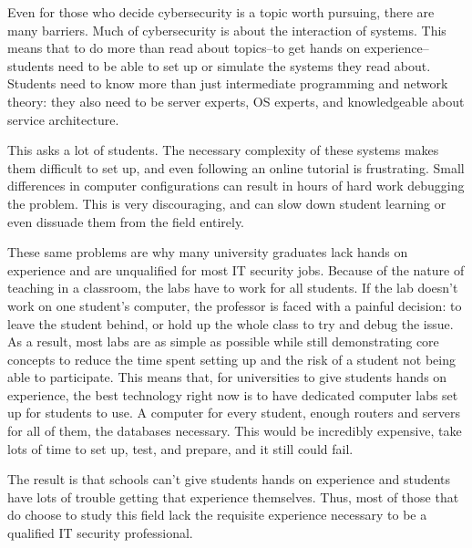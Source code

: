 \documentclass[openright]{report}
\begin{document}
\par Even for those who decide cybersecurity is a topic worth pursuing, there are many barriers. Much of cybersecurity is about the interaction of systems. This means that to do more than read about topics--to get hands on experience--students need to be able to set up or simulate the systems they read about. Students need to know more than just intermediate programming and network theory: they also need to be server experts, OS experts, and knowledgeable about service architecture. 

\par This asks a lot of students. The necessary complexity of these systems makes them difficult to set up, and even following an online tutorial is frustrating. Small differences in computer configurations can result in hours of hard work debugging the problem. This is very discouraging, and can slow down student learning or even dissuade them from the field entirely. 

\par These same problems are why many university graduates lack hands on experience and are unqualified for most IT security jobs. Because of the nature of teaching in a classroom, the labs have to work for all students. If the lab doesn't work on one student's computer, the professor is faced with a painful decision: to leave the student behind, or hold up the whole class to try and debug the issue. As a result, most labs are as simple as possible while still demonstrating core concepts to reduce the time spent setting up and the risk of a student not being able to participate\cite{ibrahiminterview}. This means that, for universities to give students hands on experience, the best technology right now is to have dedicated computer labs set up for students to use. A computer for every student, enough routers and servers for all of them, the databases necessary. This would be incredibly expensive, take lots of time to set up, test, and prepare, and it still could fail.

\par The result is that schools can't give students hands on experience and students have lots of trouble getting that experience themselves. Thus, most of those that do choose to study this field lack the requisite experience necessary to be a qualified IT security professional.
\end{document}
